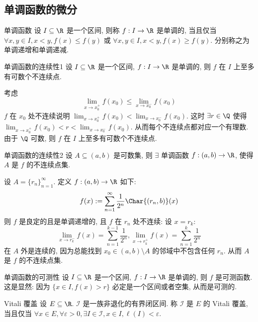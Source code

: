 \subsection{单调函数的微分}
\begin{dfn}
    {单调函数}
    设 $I\subseteq\R$ 是一个区间, 则称 \(f:I\to\R\) 是单调的, 当且仅当 \(\forall x,y\in I, x<y, f(x)\leq f(y)\) 或 \(\forall x,y\in I, x<y, f(x)\geq f(y)\). 分别称之为单调递增和单调递减.
\end{dfn}
\begin{ppt}
    {单调函数的连续性1}
    设 $I\subseteq\R$ 是一个区间, \(f:I\to\R\) 是单调的, 则 \(f\) 在 \(I\) 上至多有可数个不连续点.
\end{ppt}
\begin{prf}
    考虑
    \[\lim_{x\to x_0^+}f(x_0)\leq\lim_{x\to x_0^-}f(x_0)\]
    \(f\) 在 \(x_0\) 处不连续说明 \(\lim_{x\to x_0^+}f(x_0)<\lim_{x\to x_0^-}f(x_0)\). 这时 \(\exists r\in\Q\) 使得 \(\lim_{x\to x_0^+}f(x_0)<r<\lim_{x\to x_0^-}f(x_0)\). 从而每个不连续点都对应一个有理数. 由于 \(\Q\) 可数, 则 \(f\) 在 \(I\) 上至多有可数个不连续点.
\end{prf}
\begin{ppt}
    {单调函数的连续性2}
    设 \(A\subseteq (a,b)\) 是可数集, 则 \(\exists\) 单调函数 \(f:(a,b)\to\R\), 使得 \(A\) 是 \(f\) 的不连续点集.
\end{ppt}
\begin{prf}
    设 \(A=\{r_n\}_{n=1}^\infty\). 定义 \(f:(a,b)\to\R\) 如下:
    \[f(x):=\sum_{n=1}^\infty \frac{1}{2^n}\Char{(r_n,b)}(x)\]
    则 \(f\) 是良定的且是单调递增的, 且 \(f\) 在 \(r_n\) 处不连续: 设 \(x=r_k\):
    \[\lim_{x\to r_k^-}f(x)=\sum_{n=1}^{k-1}\frac{1}{2^n}, \lim_{x\to r_k^+}f(x)=\sum_{n=1}^{k}\frac{1}{2^n}\]
    在 \(A\) 外是连续的, 因为总能找到 \(x_0\in (a,b)\setminus A\) 的邻域中不包含任何 \(r_n\). 从而 \(A\) 是 \(f\) 的不连续点集.
\end{prf}
\begin{ppt}
    {单调函数的可测性}
    设 \(I\subseteq\R\) 是一个区间, \(f:I\to\R\) 是单调的, 则 \(f\) 是可测函数.\\
    这是显然: 因为 \(\{x\in I, f(x)>r\}\) 必定是一个区间或者空集, 从而是可测的.
\end{ppt}
\begin{dfn}
    {Vitali 覆盖}
    设 \(E\subseteq\R\). \(\mathcal{I}\) 是一族非退化的有界闭区间. 称 \(\mathcal{I}\) 是 \(E\) 的 Vitali 覆盖, 当且仅当 \(\forall x\in E,\forall\varepsilon>0, \exists I\in\mathcal{I}, x\in I, \ell(I)<\varepsilon\).
\end{dfn}

